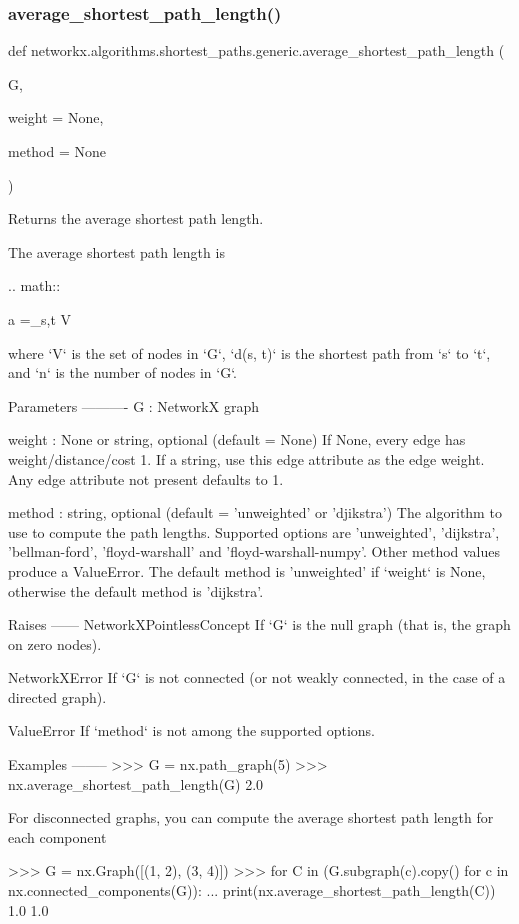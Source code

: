 \subsubsection{\texorpdfstring{average\+\_\+shortest\+\_\+path\+\_\+length()}{average\_shortest\_path\_length()}}
{\footnotesize\ttfamily def networkx.\+algorithms.\+shortest\+\_\+paths.\+generic.\+average\+\_\+shortest\+\_\+path\+\_\+length (\begin{DoxyParamCaption}\item[{}]{G,  }\item[{}]{weight = {\ttfamily None},  }\item[{}]{method = {\ttfamily None} }\end{DoxyParamCaption})}

\begin{DoxyVerb}Returns the average shortest path length.

The average shortest path length is

.. math::

   a =\sum_{s,t \in V} 

where `V` is the set of nodes in `G`,
`d(s, t)` is the shortest path from `s` to `t`,
and `n` is the number of nodes in `G`.

Parameters
----------
G : NetworkX graph

weight : None or string, optional (default = None)
   If None, every edge has weight/distance/cost 1.
   If a string, use this edge attribute as the edge weight.
   Any edge attribute not present defaults to 1.

method : string, optional (default = 'unweighted' or 'djikstra')
    The algorithm to use to compute the path lengths.
    Supported options are 'unweighted', 'dijkstra', 'bellman-ford',
    'floyd-warshall' and 'floyd-warshall-numpy'.
    Other method values produce a ValueError.
    The default method is 'unweighted' if `weight` is None,
    otherwise the default method is 'dijkstra'.

Raises
------
NetworkXPointlessConcept
    If `G` is the null graph (that is, the graph on zero nodes).

NetworkXError
    If `G` is not connected (or not weakly connected, in the case
    of a directed graph).

ValueError
    If `method` is not among the supported options.

Examples
--------
>>> G = nx.path_graph(5)
>>> nx.average_shortest_path_length(G)
2.0

For disconnected graphs, you can compute the average shortest path
length for each component

>>> G = nx.Graph([(1, 2), (3, 4)])
>>> for C in (G.subgraph(c).copy() for c in nx.connected_components(G)):
...     print(nx.average_shortest_path_length(C))
1.0
1.0\end{DoxyVerb}
